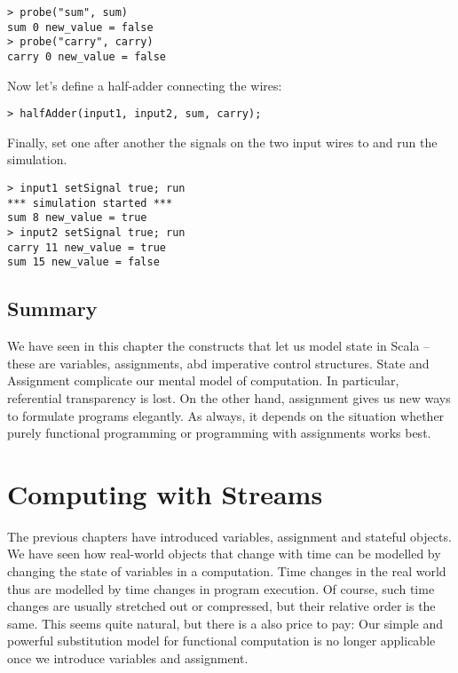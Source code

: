 {\begin{lstlisting}
> probe("sum", sum)
sum 0 new_value = false
> probe("carry", carry)
carry 0 new_value = false
\end{lstlisting}
Now let's define a half-adder connecting the wires:
\begin{lstlisting}
> halfAdder(input1, input2, sum, carry);
\end{lstlisting}
Finally, set one after another the signals on the two input wires to
 and run the simulation.
\begin{lstlisting}
> input1 setSignal true; run
*** simulation started ***
sum 8 new_value = true
> input2 setSignal true; run
carry 11 new_value = true
sum 15 new_value = false
\end{lstlisting}

\section{Summary}

We have seen in this chapter the constructs that let us model state in
Scala -- these are variables, assignments, abd imperative control
structures.  State and Assignment complicate our mental model of
computation.  In particular, referential transparency is lost.  On the
other hand, assignment gives us new ways to formulate programs
elegantly. As always, it depends on the situation whether purely
functional programming or programming with assignments works best.

\chapter{Computing with Streams}

The previous chapters have introduced variables, assignment and
stateful objects.  We have seen how real-world objects that change
with time can be modelled by changing the state of variables in a
computation.  Time changes in the real world thus are modelled by time
changes in program execution. Of course, such time changes are usually
stretched out or compressed, but their relative order is the same.
This seems quite natural, but there is a also price to pay: Our simple
and powerful substitution model for functional computation is no
longer applicable once we introduce variables and assignment.

}
